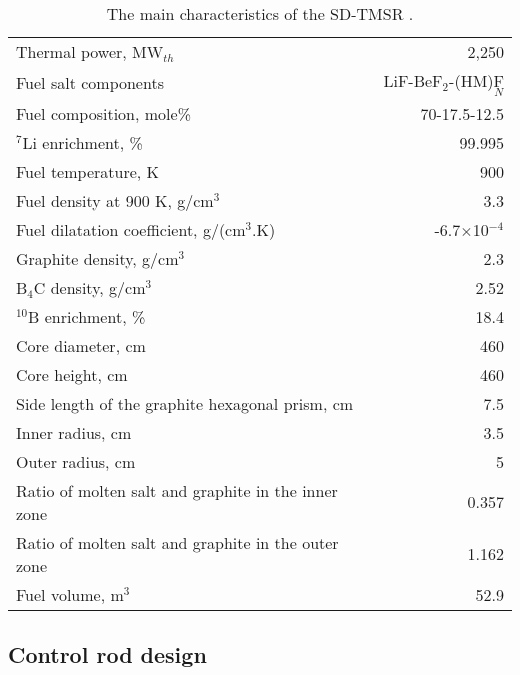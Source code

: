 \begin{table}  %
	\caption{The main characteristics of the SD-TMSR \cite{li_optimization_2018}.}
	\vspace{0.1in}
	\begin{tabularx}{\textwidth}{l | r}
		\hline
		Thermal power, MW$_{th}$          				&  2,250  \\ 
		Fuel salt components                            & LiF-BeF$_2$-(\gls{HM})F$_N$ \\
		Fuel composition, mole\%                        & 70-17.5-12.5    \\
		$^7$Li enrichment, \%        				& 99.995   \\
		Fuel temperature, K 							& 900  \\
		Fuel density at 900 K, g/cm$^3$		  		& 3.3 \\
		Fuel dilatation coefficient, g/(cm$^3$$.$K)  &  -6.7$\times$10$^{-4}$ \\
		Graphite density, g/cm$^3$             	    & 2.3	\\  
		B$_4$C density, g/cm$^3$					& 2.52  \\
		$^{10}$B enrichment, \%						&  18.4  \\
		Core diameter, cm								& 460  \\
		Core height, cm									& 460  \\
		Side length of the graphite hexagonal prism, cm   & 7.5 \\
		Inner radius, cm							& 3.5  \\
		Outer radius, cm							& 5  \\
		Ratio of molten salt and graphite in the inner zone	&  0.357  \\
		Ratio of molten salt and graphite in the outer zone &  1.162  \\
		Fuel volume, m$^3$  &	52.9 \\
		\hline
	\end{tabularx}
	\label{tab:table1}
\end{table}


\subsection{Control rod design} \label{CRD}

